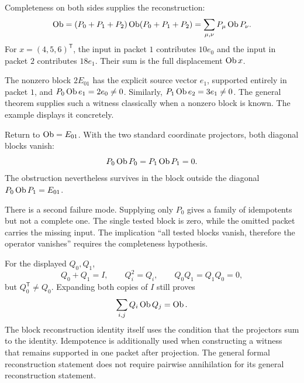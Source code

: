 
Completeness on both sides supplies the reconstruction:
\[
\operatorname{Ob}=(P_0+P_1+P_2)\operatorname{Ob}(P_0+P_1+P_2)
=\sum_{\mu,\nu}P_\mu\operatorname{Ob} P_\nu.
\]
For $x=(4,5,6)^\mathsf T$, the input in packet $1$ contributes $10e_0$ and the input in packet $2$ contributes $18e_1$. Their sum is the full displacement $\operatorname{Ob} x$.

The nonzero block $2E_{01}$ has the explicit source vector $e_1$, supported entirely in packet $1$, and $P_0\operatorname{Ob} e_1=2e_0\ne0$. Similarly, $P_1\operatorname{Ob} e_2=3e_1\ne0$. The general theorem supplies such a witness classically when a nonzero block is known. The example displays it concretely.


Return to $\operatorname{Ob}=E_{01}$. With the two standard coordinate projectors, both diagonal blocks vanish:
\[
P_0\operatorname{Ob} P_0=P_1\operatorname{Ob} P_1=0.
\]
The obstruction nevertheless survives in the block outside the diagonal $P_0\operatorname{Ob} P_1=E_{01}$.


There is a second failure mode. Supplying only $P_0$ gives a family of idempotents but not a complete one. The single tested block is zero, while the omitted packet carries the missing input. The implication ``all tested blocks vanish, therefore the operator vanishes'' requires the completeness hypothesis.

For the displayed $Q_0,Q_1$,
\[
Q_0+Q_1=I,\qquad Q_i^2=Q_i,\qquad Q_0Q_1=Q_1Q_0=0,
\]
but $Q_0^\mathsf T\ne Q_0$. Expanding both copies of $I$ still proves
\[
\sum_{i,j}Q_i\operatorname{Ob} Q_j=\operatorname{Ob}.
\]
The block reconstruction identity itself uses the condition that the projectors sum to the identity. Idempotence is additionally used when constructing a witness that remains supported in one packet after projection. The general formal reconstruction statement does not require pairwise annihilation for its general reconstruction statement.

